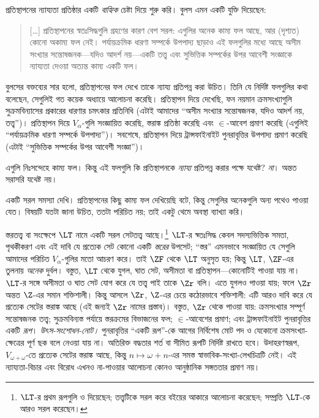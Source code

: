 \documentclass[../../../include/open-logic-section]{subfiles}
\begin{document}

প্রতিস্থাপনের ন্যায্যতা প্রতিষ্ঠার একটি
\emph{বাহ্যিক} চেষ্টা দিয়ে শুরু করি।
বুলস এমন একটি যুক্তি দিয়েছেন:
\begin{quote}
  [\ldots] প্রতিস্থাপনের স্বতঃসিদ্ধগুলি
  গ্রহণের কারণ বেশ সরল: এগুলির অনেক
  কাম্য ফল আছে, আর (দৃশ্যত) কোনো অকাম্য
  ফল নেই। পর্যায়ক্রমিক ধারণা সম্পর্কে
  উপপাদ্য ছাড়াও এই ফলগুলির মধ্যে আছে
  অসীম সংখ্যার সন্তোষজনক—যদিও আদর্শ
  নয়—একটি তত্ত্ব এবং সুভিত্তিক সম্পর্কের
  উপর আবেশী সংজ্ঞাকে ন্যায্যতা দেওয়া
  অত্যন্ত কাম্য একটি ফল।
  \citep[229]{Boolos1971}
\end{quote}
বুলসের বক্তব্যের সার হলো, প্রতিস্থাপনের
ফল দেখে তাকে ন্যায্য প্রতিপন্ন করা উচিত।
তিনি যে নির্দিষ্ট ফলগুলির কথা বলেছেন,
সেগুলিই গত কয়েক অধ্যায়ে আলোচনা করেছি।
প্রতিস্থাপন দিয়ে দেখেছি, ফন নয়মান
ক্রমসংখ্যাগুলি সুক্রমবিন্যাসের প্রকারের
ধারণার চমৎকার প্রতিনিধি (এটাই আমাদের
``অসীম সংখ্যার সন্তোষজনক, যদিও আদর্শ নয়,
তত্ত্ব'')। প্রতিস্থাপন দিয়ে $V_\alpha$-গুলি
সংজ্ঞায়িত করেছি, স্তরাঙ্ক প্রতিষ্ঠা করেছি
এবং $\in$-আবেশ প্রমাণ করেছি (এগুলিই
``পর্যায়ক্রমিক ধারণা সম্পর্কে উপপাদ্য'')।
সবশেষে, প্রতিস্থাপন দিয়ে ট্রান্সফাইনাইট
পুনরাবৃত্তির উপপাদ্য প্রমাণ করেছি (এটাই
``সুভিত্তিক সম্পর্কের উপর আবেশী সংজ্ঞা'')।

এগুলি নিঃসন্দেহে কাম্য ফল। কিন্তু এই
ফলগুলি কি প্রতিস্থাপনকে \emph{ন্যায্য}
প্রতিপন্ন করার পক্ষে যথেষ্ট? \emph{না}।
অন্তত সরাসরি যথেষ্ট নয়।

একটি সরল সমস্যা দেখি। প্রতিস্থাপনের কিছু
কাম্য ফল দেখিয়েছি বটে, কিন্তু সেগুলির
অনেকগুলি অন্য পথেও পাওয়া যেত। বিষয়টি
যতটা জানা উচিত, ততটা পরিচিত নয়;
তাই একটু থেমে অবস্থা ব্যাখ্যা করি।

স্তরতত্ত্ব বা সংক্ষেপে $\LT$ নামে একটি
সরল সেটতত্ত্ব আছে।\footnote{$\LT$-র প্রথম
রূপগুলি \citet{Montague1965} ও
\citet{Scott1974} দিয়েছেন; \citet{Potter2004}
তত্ত্বটিকে সরল করে বইয়ের আকারে আলোচনা
করেছেন; সম্প্রতি \citet{ButtonLT1} $\LT$-কে
আরও সরল করেছেন।} $\LT$-র স্বতঃসিদ্ধ
কেবল সদস্যভিত্তিক সমতা, পৃথকীকরণ এবং এই দাবি যে
প্রত্যেক সেট কোনো একটি \emph{স্তরের} উপসেট;
``স্তর'' এমনভাবে সংজ্ঞায়িত যে সেগুলি আমাদের
পরিচিত $V_\alpha$-গুলির মতো আচরণ করে।
তাই $\ZF$ থেকে $\LT$ অনুসৃত হয়; কিন্তু
$\LT$, $\ZF$-এর তুলনায় \emph{অনেক}
দুর্বল। বস্তুত, $\LT$ থেকে যুগল, ঘাত সেট,
অসীমতা বা প্রতিস্থাপন—কোনোটিই পাওয়া যায় না।
$\LT$-র সঙ্গে অসীমতা ও ঘাত সেট যোগ করে
যে তত্ত্ব পাই তাকে $\Zr$ বলি। এতে যুগলও
পাওয়া যায়; ফলে $\Zr$ অন্তত $\Z$-এর
সমান শক্তিশালী। কিন্তু আসলে $\Zr$,
$\Z$-এর চেয়ে কঠোরভাবে শক্তিশালী:
এটি আরও দাবি করে যে প্রত্যেক সেটের
স্তরাঙ্ক আছে (এই জন্যই $\Zr$ নামের
প্রস্তাব)। বস্তুত, $\Zr$ থেকে পাওয়া যায়:
ক্রমসংখ্যার সম্পূর্ণ সন্তোষজনক তত্ত্ব;
সুক্রমবিন্যস্ত পর্যায়ে স্তরক্রমের বিভাজনের ফল;
$\in$-আবেশের প্রমাণ; এবং ট্রান্সফাইনাইট
পুনরাবৃত্তির একটি \emph{রূপ}।
\emph{উৎস-সংশোধন-নোট।} পুনরাবৃত্তির ``একটি রূপ''-কে
আগের নির্বিশেষ মোট পদ ও যেকোনো ক্রমসংখ্যা-ক্ষেত্রের পূর্ণ ছক
বলে নেওয়া যায় না। অতিরিক্ত বদ্ধতার শর্ত বা সীমিত রূপটি
নির্দিষ্ট রাখতে হবে। উদাহরণস্বরূপ, $V_{\omega+\omega}$-তে
প্রত্যেক সেটের স্তরাঙ্ক আছে, কিন্তু $n\mapsto\omega+n$-এর
সমস্ত স্বাভাবিক-সংখ্যা-লেখচিত্রটি নেই। এই ন্যায্যতা-বিচার এবং
বিরোধ এখনও না-পাওয়ার আলোচনা কোনও আনুষ্ঠানিক সঙ্গততার প্রমাণ নয়।
\end{document}
